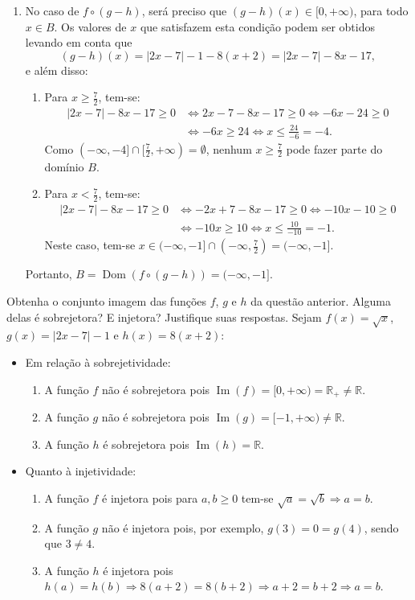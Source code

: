 \documentclass[12pt,a4paper]{article}
\newcommand*\dom[1]{\operatorname{Dom}\left(#1\right)}
\newcommand*\im[1]{\operatorname{Im}\left(#1\right)}
\newcommand*\R{\mathbb{R}}
\begin{document}
\begin{ExerciseList}
\begin{enumerate}
\item No caso de $f \circ (g-h)$, será preciso que $(g-h)(x) \in [0, +\infty)$, para todo $x \in B$. Os valores de $x$ que satisfazem esta condição podem ser obtidos levando em conta que
\[
(g-h)(x) = |2x - 7| - 1 - 8 (x + 2) = |2x - 7| - 8x - 17,
\]
e além disso:
\begin{enumerate}
\item Para $x \geq \frac{7}{2}$, tem-se:
\begin{align*}
|2x - 7| - 8x - 17 \geq 0
& \Leftrightarrow
 2x - 7  - 8x - 17 \geq 0
  \Leftrightarrow
-6x -24 \geq 0 \\
& \Leftrightarrow
-6x \geq 24
  \Leftrightarrow
x \leq \frac{24}{-6} = -4.
\end{align*}
Como $(-\infty, -4] \cap [\frac{7}{2}, +\infty) = \emptyset$, nenhum $x \geq \frac{7}{2}$ pode fazer parte do domínio $B$.
\item Para $x < \frac{7}{2}$, tem-se:
\begin{align*}
|2x - 7| - 8x - 17 \geq 0
& \Leftrightarrow
-2x + 7  - 8x - 17 \geq 0
  \Leftrightarrow
-10x -10 \geq 0\\
& \Leftrightarrow
-10x \geq 10
  \Leftrightarrow
x \leq \frac{10}{-10} = -1.
\end{align*}
Neste caso, tem-se $x \in (-\infty, -1] \cap (-\infty, \frac{7}{2}) = (-\infty, -1]$.
\end{enumerate}
Portanto, $B = \dom{f \circ (g-h)} = (-\infty, -1]$.
\end{enumerate}

\Exercise[title={2,0}] Obtenha o conjunto imagem das funções $f$, $g$ e $h$ da questão anterior. Alguma delas é sobrejetora? E injetora? Justifique suas respostas.
\Answer Sejam $f(x) = \sqrt{x}$, $g(x) = |2x - 7| - 1$ e $h(x) =  8 (x + 2)$:
\begin{itemize}
\item Em relação à sobrejetividade:
\begin{enumerate}
\item A função $f$ não é sobrejetora pois $\im{f} = [0, +\infty) = \R_+ \neq \R$.
\item A função $g$ não é sobrejetora pois $\im{g} = [-1, +\infty) \neq \R$.
\item A função $h$ é sobrejetora pois $\im{h} = \R$.
\end{enumerate}
\item Quanto à injetividade:
\begin{enumerate}
\item A função $f$ é injetora pois para $a, b \geq 0$ tem-se $\sqrt{a} = \sqrt{b}\Rightarrow a = b$.
\item A função $g$ não é injetora pois, por exemplo, $g(3) = 0 = g(4)$, sendo que $3 \neq 4$.
\item A função $h$ é injetora pois $h(a) = h(b) \Rightarrow 8(a+2) = 8(b+2) \Rightarrow a+2 = b+2 \Rightarrow a=b$.
\end{enumerate}
\end{itemize}


\end{ExerciseList}
\end{document}
